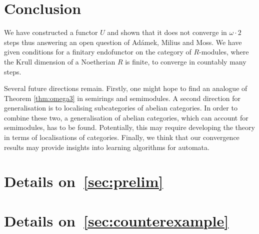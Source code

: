 \documentclass[runningheads]{llncs}
\begin{document}
\section{Conclusion}
We have constructed a functor $U$ and shown that it does not converge in $\omega \cdot 2$ steps thus answering an open question of Ad\'{a}mek, Milius and Moss. 
We have given conditions for a finitary endofunctor on the category of $R$-modules, where the Krull dimension of a Noetherian $R$ is finite, to converge in countably many steps.

Several future directions remain.
Firstly, one might hope to find an analogue of Theorem \ref{thm:omega3} in semirings and semimodules.
A second direction for generalisation is to localising subcategories of abelian categories.
In order to combine these two, a generalisation of abelian categories, which can account for semimodules, has to be found.
Potentially, this may require developing the theory in terms of localisations of categories.
Finally, we think that our convergence results may provide insights into learning algorithms for automata.



\newpage
\appendix
\section{Details on~\cref{sec:prelim}}
\printProofs[prelim]
\section{Details on~\cref{sec:counterexample}}
\printProofs[counterexample]
\end{document}
